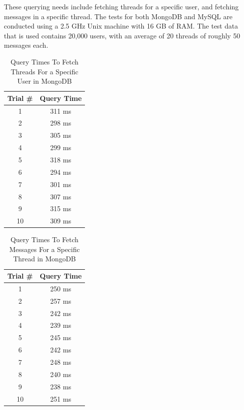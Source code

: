\documentclass[12pt]{article}
\begin{document}
These querying needs include fetching threads for a specific user, and fetching messages in a specific thread. The tests for both MongoDB and MySQL are conducted using a 2.5 GHz Unix machine with 16 GB of RAM. The test data that is used contains 20,000 users, with an average of 20 threads of roughly 50 messages each. 

\begin{table}[h!]
\centering
\caption{Query Times To Fetch Threads For a Specific User in MongoDB}
\vspace{2mm}
\begin{tabular}{|c|c|} 
 \hline
 Trial \# & Query Time \\ [0.5ex] 
 \hline\hline
 1 & 311 ms \\ 
 2 & 298 ms \\
 3 & 305 ms \\
 4 & 299 ms \\
 5 & 318 ms \\
 6 & 294 ms \\
 7 & 301 ms \\
 8 & 307 ms \\
 9 & 315 ms \\
 10 & 309 ms \\
 \hline
\end{tabular}
\end{table}

\begin{table}[h!]
\centering
\caption{Query Times To Fetch Messages For a Specific Thread in MongoDB}
\vspace{2mm}
\begin{tabular}{|c|c|} 
 \hline
 Trial \# & Query Time \\ [0.5ex] 
 \hline\hline
 1 & 250 ms \\ 
 2 & 257 ms \\
 3 & 242 ms \\
 4 & 239 ms \\
 5 & 245 ms \\
 6 & 242 ms \\
 7 & 248 ms \\
 8 & 240 ms \\
 9 & 238 ms \\
 10 & 251 ms \\
 \hline
\end{tabular}
\end{table}
\end{document}
